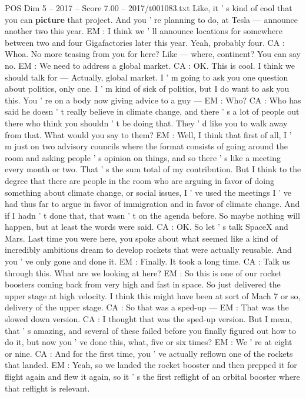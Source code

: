 \begin{textsample}{POS Dim 5 – 2017 – Score 7.00 – 2017/t001083.txt}
Like, it ' s kind of cool that you can \textbf{picture} that project.
And you ' re planning to do, at Tesla — announce another two this year.
EM : I think we ' ll announce locations for somewhere between two and four Gigafactories later this year.
Yeah, probably four.
CA : Whoa.
No more teasing from you for here?
Like — where, continent?
You can say no.
EM : We need to address a global market.
CA : OK.
This is cool.
I think we should talk for — Actually, global market.
I ' m going to ask you one question about politics, only one.
I ' m kind of sick of politics, but I do want to ask you this.
You ' re on a body now giving advice to a guy — EM : Who?
CA : Who has said he doesn ' t really believe in climate change, and there ' s a lot of people out there who think you shouldn ' t be doing that.
They ' d like you to walk away from that.
What would you say to them?
EM : Well, I think that first of all, I ' m just on two advisory councils where the format consists of going around the room and asking people ' s opinion on things, and so there ' s like a meeting every month or two.
That ' s the sum total of my contribution.
But I think to the degree that there are people in the room who are arguing in favor of doing something about climate change, or social issues, I ' ve used the meetings I ' ve had thus far to argue in favor of immigration and in favor of climate change.
And if I hadn ' t done that, that wasn ' t on the agenda before.
So maybe nothing will happen, but at least the words were said.
CA : OK.
So let ' s talk SpaceX and Mars.
Last time you were here, you spoke about what seemed like a kind of incredibly ambitious dream to develop rockets that were actually reusable.
And you ' ve only gone and done it.
EM : Finally.
It took a long time.
CA : Talk us through this.
What are we looking at here?
EM : So this is one of our rocket boosters coming back from very high and fast in space.
So just delivered the upper stage at high velocity.
I think this might have been at sort of Mach 7 or so, delivery of the upper stage.
CA : So that was a sped-up — EM : That was the slowed down version.
CA : I thought that was the sped-up version.
But I mean, that ' s amazing, and several of these failed before you finally figured out how to do it, but now you ' ve done this, what, five or six times?
EM : We ' re at eight or nine.
CA : And for the first time, you ' ve actually reflown one of the rockets that landed.
EM : Yeah, so we landed the rocket booster and then prepped it for flight again and flew it again, so it ' s the first reflight of an orbital booster where that reflight is relevant.

\end{textsample}
